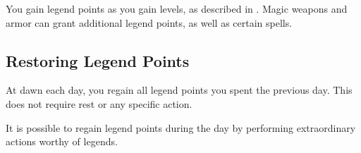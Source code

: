 You gain legend points as you gain levels, as described in .
Magic weapons and armor can grant additional legend points, as well as certain spells.

\subsection{Restoring Legend Points}

At dawn each day, you regain all legend points you spent the previous day. This does not require rest or any specific action.

It is possible to regain legend points during the day by performing extraordinary actions worthy of legends.
